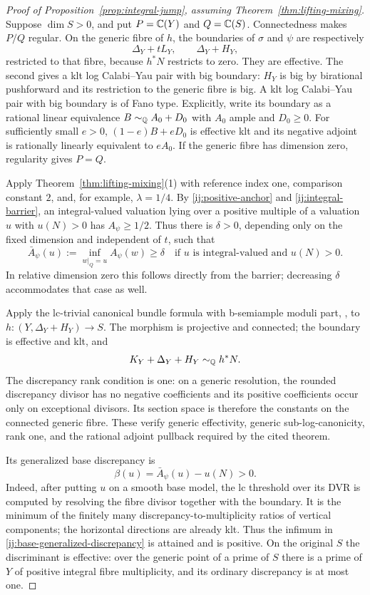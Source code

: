 \begin{proof}[Proof of Proposition~\ref{prop:integral-jump}, assuming
Theorem~\ref{thm:lifting-mixing}]
Suppose $\dim S>0$, and put $P=\mathbb C(Y)$ and $Q=\mathbb C(S)$.
Connectedness makes $P/Q$ regular.  On the generic fibre of $h$,
the boundaries of $\sigma$ and $\psi$ are respectively
\[
 \Delta_Y+tL_Y,
 \qquad \Delta_Y+H_Y,
\]
restricted to that fibre, because $h^*N$ restricts to zero.
They are effective.  The second gives a klt log Calabi--Yau pair
with big boundary: $H_Y$ is big by birational pushforward and its
restriction to the generic fibre is big.  A klt log Calabi--Yau
pair with big boundary is of Fano type.  Explicitly, write its
boundary as a rational linear equivalence $B\sim_{\mathbb Q}A_0+D_0$
with $A_0$ ample and $D_0\ge0$.  For sufficiently small $e>0$,
$(1-e)B+eD_0$ is effective klt and its negative adjoint is
rationally linearly equivalent to $eA_0$.
If the generic fibre has dimension zero, regularity gives $P=Q$.

Apply Theorem~\ref{thm:lifting-mixing}(1) with reference index one,
comparison constant $2$, and, for example, $\lambda=1/4$.
By \eqref{ij:positive-anchor} and \eqref{ij:integral-barrier}, an
integral-valued valuation lying over a positive multiple of a
valuation $u$ with $u(N)>0$ has $A_\psi\ge1/2$.
Thus there is $\delta>0$, depending only on the fixed dimension
and independent of $t$, such that
\begin{equation}
\label{ij:base-lower-bound}
 \bar A_\psi(u):=\inf_{w|_Q=u}A_\psi(w)\ge\delta
 \quad\text{if }u\text{ is integral-valued and }u(N)>0.
\end{equation}
In relative dimension zero this follows directly from the barrier;
decreasing $\delta$ accommodates that case as well.

Apply the lc-trivial canonical bundle formula with b-semiample
moduli part, \cite[Theorems~1.5 and~6.28]{BFMT}, to
$h:(Y,\Delta_Y+H_Y)\to S$.
The morphism is projective and connected; the boundary is effective
and klt, and
\[
 K_Y+\Delta_Y+H_Y\sim_{\mathbb Q}h^*N.
\]
The discrepancy rank condition is one: on a generic resolution,
the rounded discrepancy divisor has no negative coefficients and
its positive coefficients occur only on exceptional divisors.
Its section space is therefore the constants on the connected
generic fibre.  These verify generic effectivity, generic
sub-log-canonicity, rank one, and the rational adjoint pullback
required by the cited theorem.

Its generalized base discrepancy is
\begin{equation}
\label{ij:base-generalized-discrepancy}
 \beta(u)=\bar A_\psi(u)-u(N)>0.
\end{equation}
Indeed, after putting $u$ on a smooth base model, the lc threshold
over its DVR is computed by resolving the fibre divisor together
with the boundary.  It is the minimum of the finitely many
discrepancy-to-multiplicity ratios of vertical components; the
horizontal directions are already klt.  Thus the infimum in
\eqref{ij:base-generalized-discrepancy} is attained and is positive.
On the original $S$ the discriminant is effective: over the generic
point of a prime of $S$ there is a prime of $Y$ of positive integral
fibre multiplicity, and its ordinary discrepancy is at most one.


\end{proof}
